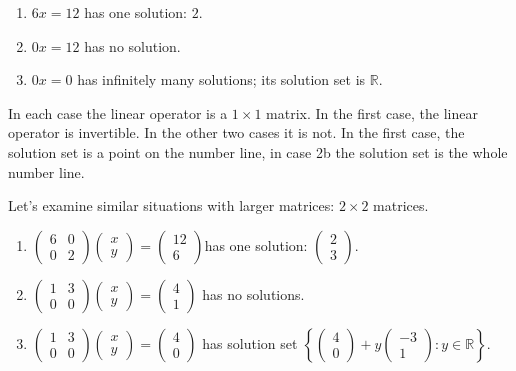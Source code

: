 \begin{enumerate}
\item $6x=12$ has one solution: $2$.
\item[2a.] $0x=12$ has no solution.
\item[2b.] $0x=0$ has infinitely many solutions; its solution set is $\mathbb{R}$.
\end{enumerate}
In each case the linear operator is a $1\times 1$ matrix. In the first case, the linear operator is invertible. 
In the other two cases it is not. 
In the first case, the solution set is a point on the number line, in  case 2b the solution set is the whole number line.

Let's examine similar situations with larger matrices: $2\times 2$ matrices.
\begin{enumerate}
\item
$\begin{pmatrix}
6	&0 	\\
0 	&2 	
\end{pmatrix} 
\begin{pmatrix}
 x \\ 
y 
\end{pmatrix} 
=
\begin{pmatrix}
12 \\ 
6
\end{pmatrix}$has  one solution: 
$\begin{pmatrix}
2 \\ 
3
\end{pmatrix}.$

\item[2a.] 
$\begin{pmatrix}
1	&3 	\\
0 	&0 	
\end{pmatrix} 
\begin{pmatrix}
 x \\ 
y 
\end{pmatrix} 
=
\begin{pmatrix}
4 \\ 
1 
\end{pmatrix}$ has no solutions.

\item[2bi.]
$\begin{pmatrix}
1	&3 	\\
0 	&0 	
\end{pmatrix} 
\begin{pmatrix}
 x \\ 
y 
\end{pmatrix} 
=
\begin{pmatrix}
4 \\ 
0
\end{pmatrix} $ has solution set 
$\left \{ 
\left(\begin{array}{c}
4 \\ 
0
\end{array} \right)
+
y\left(\begin{array}{c}
-3 \\ 
1
\end{array} \right)
: y\in \mathbb{R} \right\}.$


\end{enumerate}
